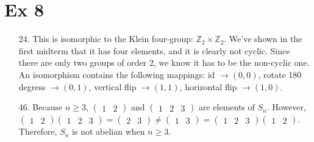 \documentclass{article}
\begin{document}
\section*{Ex 8}
\begin{itemize}
\item [24.] This is isomorphic to the Klein four-group: $\mathbb{Z}_2 \times \mathbb{Z}_2$. We've shown in the first midterm that it has four elements, and it is clearly not cyclic. Since there are only two groups of order $2$, we know it has to be the non-cyclic one. An isomorphism contains the following mappings:
  id $\rightarrow (0,0)$, rotate 180 degress $\rightarrow (0,1)$, vertical flip $\rightarrow (1,1)$, horizontal flip $\rightarrow (1,0)$. 
\item [46.]
  Because $n \geq 3$, $
  \begin{pmatrix}
    1 & 2
  \end{pmatrix}
$ and $
\begin{pmatrix}
  1 & 2 & 3
\end{pmatrix}
$ are elements of $S_n$. However,
$
\begin{pmatrix}
  1 & 2
\end{pmatrix}
\begin{pmatrix}
  1 & 2 & 3
\end{pmatrix} =
\begin{pmatrix}
  2 & 3
\end{pmatrix}
\neq
\begin{pmatrix}
  1 & 3
\end{pmatrix}
=
\begin{pmatrix}
  1 & 2 & 3
\end{pmatrix}
\begin{pmatrix}
  1 & 2
\end{pmatrix}
$. Therefore, $S_n$ is not abelian when $n \geq 3$.
\end{itemize}
\end{document}

